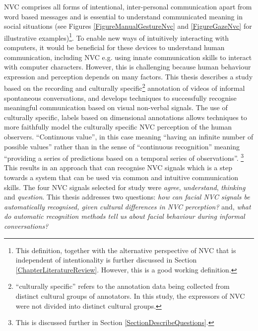 \acf{NVC} comprises all forms of intentional, inter-personal communication apart from word based messages and is essential to understand communicated meaning in social situations \cite{Knapp2009} (see Figures \ref{FigureManualGestureNvc} and \ref{FigureGazeNvc} for illustrative examples)\footnote{This definition, together with the alternative perspective of \ac{NVC}  that is independent of intentionality is further discussed in Section \ref{ChapterLiteratureReview}. However, this is a good working definition.}. To enable new ways of intuitively interacting with computers, it would be beneficial for these devices to understand human communication, including \ac{NVC} e.g. using innate communication skills to interact with computer characters. However, this is challenging because human behaviour expression and perception depends on many factors. This thesis describes a study based on the recording and culturally specific\footnote{``culturally specific'' refers to the annotation data being collected from distinct cultural groups of annotators. In this study, the expressors of \ac{NVC} were not divided into distinct cultural groups.} annotation of videos of informal spontaneous conversations, and develops techniques to successfully recognise meaningful communication based on visual non-verbal signals. The use of culturally specific, \continuous labels based on dimensional annotations allows techniques to more faithfully model the culturally specific \ac{NVC} perception of the human observers. ``Continuous value'', in this case meaning ``having an infinite number of possible values'' rather than in the sense of ``continuous recognition'' meaning ``providing a series of predictions based on a temporal series of observations''. \footnote{This is discussed further in Section \ref{SectionDescribeQuestions}.} This results in an approach that can recognise \ac{NVC} signals which is a step towards a system that can be used via common and intuitive communication skills. The four \ac{NVC} signals selected for study were \textit{agree}, \textit{understand}, \textit{thinking} and \textit{question}. This thesis addresses two questions: \textit{how can facial \ac{NVC} signals be automatically recognised}\textit{, given cultural differences in \ac{NVC} perception?} and, \textit{what do automatic recognition methods tell us }\textit{about facial behaviour during informal conversations?}

